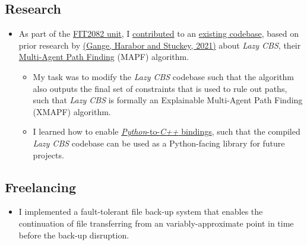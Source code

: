 \documentclass[a4paper, 10pt, roman, colorlinks, linkcolor=purple, filecolor=purple, citecolor=blue, urlcolor=blue]{moderncv}
\begin{document}
	\subsection{Research}
	\begin{itemize}
		\item As part of the \href{https://handbook.monash.edu/2021/units/FIT2082}{FIT2082 unit}, I \href{https://github.com/AppleGamer22/FIT2082}{contributed} to an \href{https://bitbucket.org/gkgange/lazycbs}{existing codebase}, based on prior research by \href{https://ojs.aaai.org/index.php/ICAPS/article/view/3471}{(Gange, Harabor and Stuckey, 2021)} about \textsl{Lazy CBS}, their \href{https://en.wikipedia.org/wiki/Pathfinding#Multi-agent_pathfinding}{Multi-Agent Path Finding} (MAPF) algorithm.
		\begin{itemize}
			\item My task was to modify the \textsl{Lazy CBS} codebase such that the algorithm also outputs the final set of constraints that is used to rule out paths, such that \textsl{Lazy CBS} is formally an Explainable Multi-Agent Path Finding (XMAPF) algorithm.
			\item I learned how to enable \href{https://pybind11.readthedocs.io/en/stable/}{\textsl{Python}-to-\textsl{C++} bindings}, such that the compiled \textsl{Lazy CBS} codebase can be used as a Python-facing library for future projects.
		\end{itemize}
	\end{itemize}

	\subsection{Freelancing}
	\begin{itemize}
		\item I implemented a fault-tolerant file back-up system that enables the continuation of file transferring from an variably-approximate point in time before the back-up disruption.
	\end{itemize}
\end{document}
